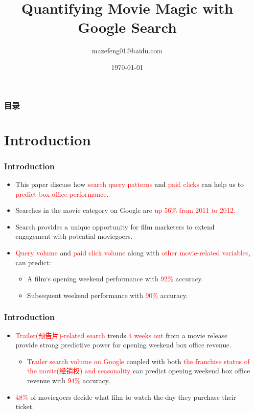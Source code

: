 \documentclass[slidestop,compress,red,mathserif]{beamer}
\title{Quantifying Movie Magic with Google Search}
\author{mazefeng01@baidu.com}
\institute{Baidu, Inc}
\date{\today}
\begin{document}
\begin{frame}
\titlepage
\end{frame}

\begin{frame}
\frametitle{目录}
\tableofcontents
\end{frame}

\section{Introduction}
\begin{frame}
\frametitle{Introduction}
\begin{itemize}
\pause \item This paper discuss how \textcolor{red}{search query patterns} and \textcolor{red}{paid clicks} can help us to \textcolor{red}{predict box office performance}.
\pause \item Searches in the movie category on Google are \textcolor{red}{up 56\% from 2011 to 2012.}
\pause \item Search provides a unique opportunity for film marketers to extend engagement with potential moviegoers.
\pause \item \textcolor{red}{Query volume} and \textcolor{red}{paid click volume} along with \textcolor{red}{other movie-related variables}, can predict:
	\begin{itemize}
	\pause \item A film`s opening weekend performance with \textcolor{red}{92\%} accuracy.
	\pause \item Subsequent weekend performance with \textcolor{red}{90\%} accuracy.
	\end{itemize}
\end{itemize}
\end{frame}
\begin{frame}
\frametitle{Introduction}
\begin{itemize}
\pause \item \textcolor{red}{Trailer(预告片)-related search} trends \textcolor{red}{4 weeks out} from a movie release provide strong predictive power 
	for opening weekend box office revenue.
	\begin{itemize}
	\pause \item \textcolor{red}{Trailer search volume on Google} coupled with both \textcolor{red}{the franchise status of the movie(经销权) and seasonality} 
	can predict opening weekend box office revenue with \textcolor{red}{94\%} accuracy.
	\end{itemize}
\pause \item \textcolor{red}{48\%} of moviegoers decide what film to watch the day they purchase their ticket.
\end{itemize}
\end{frame}
\end{document}
